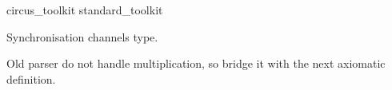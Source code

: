 \begin{zsection}
  \SECTION circus\_toolkit \parents standard\_toolkit
\end{zsection}


Synchronisation channels type.

\begin{zed}
   [Synch]
\end{zed}

Old parser do not handle multiplication, so bridge it with the next axiomatic definition.
